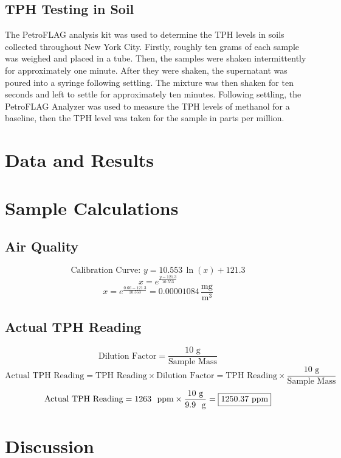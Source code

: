 \documentclass{article}
\begin{document}
    \subsection{TPH Testing in Soil}
    \indent The PetroFLAG analysis kit was used to determine the TPH levels in soils collected throughout New York City. Firstly, roughly ten grams of each sample was weighed and placed in a tube. Then, the samples were shaken intermittently for approximately one minute. After they were shaken, the supernatant was poured into a syringe following settling. The mixture was then shaken for ten seconds and left to settle for approximately ten minutes. Following settling, the PetroFLAG Analyzer was used to measure the TPH levels of methanol for a baseline, then the TPH level was taken for the sample in parts per million.
    \newpage
    \section{Data and Results}
    
    \newpage
    \section{Sample Calculations}
    \subsection{Air Quality}
    \[\text{Calibration Curve: }y=10.553\,\ln(x)+121.3\]
    \[x=e^{\frac{y-121.3}{10.553}}\] 
    \[x=e^{\frac{0.66-121.3}{10.553}}=\boxed{0.00001084\,\frac{\text{mg}}{\text{m}^3}}\] 
    \subsection{Actual TPH Reading}
    \[\text{Dilution Factor}=\frac{10\text{ g}}{\text{Sample Mass}}\]
    \[\text{Actual TPH Reading}=\text{TPH Reading}\times\text{Dilution Factor}=\text{TPH Reading}\times\frac{10\text{ g}}{\text{Sample Mass}}\] 
    \[\text{Actual TPH Reading}=\text{1263 \text{ ppm}}\times\frac{10\text{ g}}{\text{9.9 \text{ g}}}=\boxed{1250.37 \text{ ppm}}\] 
    \newpage
    \section{Discussion}
\end{document}
